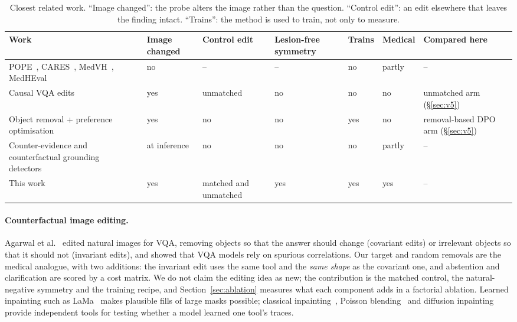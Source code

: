 \documentclass[11pt]{article}
\begin{document}
\begin{table}[t]
\centering\footnotesize\setlength{\tabcolsep}{3.5pt}
\caption{Closest related work. ``Image changed'': the probe alters the image rather than the question. ``Control edit'': an edit elsewhere that leaves the finding intact. ``Trains'': the method is used to train, not only to measure.}
\label{tab:related}
\begin{tabular}{>{\raggedright\arraybackslash}p{4.6cm}p{1.6cm}>{\raggedright\arraybackslash}p{1.9cm}p{1.6cm}p{1cm}p{1.1cm}>{\raggedright\arraybackslash}p{2.9cm}}
\toprule
Work & Image changed & Control edit & Lesion-free symmetry & Trains & Medical & Compared here \\
\midrule
\raggedright POPE~\cite{pope}, CARES~\cite{cares}, MedVH~\cite{medvh}, MedHEval~\cite{medheval} & no & -- & -- & no & partly & -- \\
Causal VQA edits~\cite{causalvqa} & yes & unmatched & no & no & no & unmatched arm (\S\ref{sec:v5}) \\
Object removal + preference optimisation~\cite{removed} & yes & no & no & yes & no & removal-based DPO arm (\S\ref{sec:v5}) \\
Counter-evidence and counterfactual grounding detectors~\cite{coev,cvgu} & at inference & no & no & no & partly & -- \\
This work & yes & matched and unmatched & yes & yes & yes & -- \\
\bottomrule
\end{tabular}
\end{table}

\paragraph{Counterfactual image editing.} Agarwal et al.~\cite{causalvqa} edited natural images for VQA, removing objects so that the answer should change (covariant edits) or irrelevant objects so that it should not (invariant edits), and showed that VQA models rely on spurious correlations. Our target and random removals are the medical analogue, with two additions: the invariant edit uses the same tool and the \emph{same shape} as the covariant one, and abstention and clarification are scored by a cost matrix. We do not claim the editing idea as new; the contribution is the matched control, the natural-negative symmetry and the training recipe, and Section~\ref{sec:ablation} measures what each component adds in a factorial ablation. Learned inpainting such as LaMa~\cite{lama} makes plausible fills of large masks possible; classical inpainting~\cite{telea}, Poisson blending~\cite{poisson} and diffusion inpainting~\cite{ldm} provide independent tools for testing whether a model learned one tool's traces.
\end{document}
